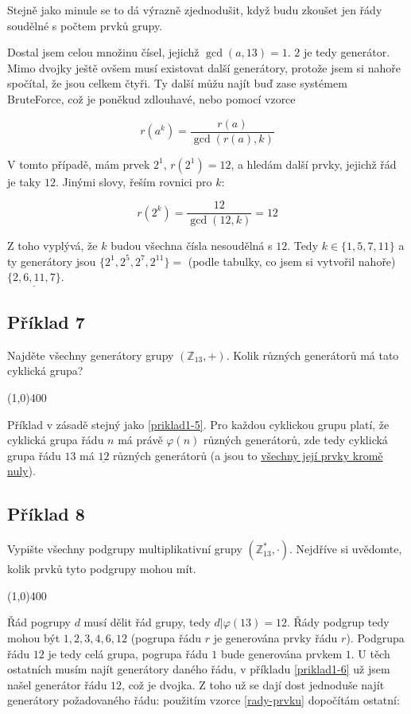 \documentclass{article}
\begin{document}
Stejně jako minule se to dá výrazně zjednodušit, když budu zkoušet jen řády soudělné s počtem prvků grupy.

Dostal jsem celou množinu čísel, jejichž $\gcd(a,13) = 1$. $2$ je tedy generátor. Mimo dvojky ještě ovšem musí existovat další generátory, protože jsem si nahoře spočítal, že jsou celkem čtyři. Ty další můžu najít buď zase systémem BruteForce\texttrademark, což je poněkud zdlouhavé, nebo pomocí vzorce

\begin{equation}
	r(a^k) = \frac{r(a)}{\gcd(r(a), k)}
	\label{rady-prvku}
\end{equation}

V tomto případě, mám prvek $2^1$, $r(2^1) = 12$, a hledám další prvky, jejichž řád je taky $12$. Jinými slovy, řeším rovnici pro $k$:

$$r(2^k) = \frac{12}{\gcd(12, k)} = 12$$

Z toho vyplývá, že $k$ budou všechna čísla nesoudělná s $12$. Tedy $k \in \{1, 5, 7, 11\}$ a ty generátory jsou $\{2^1, 2^5, 2^7, 2^{11}\} = $ (podle tabulky, co jsem si vytvořil nahoře) $\underline{\{2, 6, 11, 7\}}$.  

\subsection{Příklad 7}
Najděte všechny generátory grupy $(\mathbb{Z}_{13},+)$. Kolik různých generátorů má tato cyklická grupa?

\line(1,0){400}

Příklad v zásadě stejný jako \ref{priklad1-5}. Pro každou cyklickou grupu platí, že cyklická grupa řádu $n$ má právě $\varphi(n)$ různých generátorů, zde tedy cyklická grupa řádu $13$ má $\underline{12}$ různých generátorů (a jsou to \underline{všechny její prvky kromě nuly}).

\subsection{\label{priklad1-8}Příklad 8}
Vypište všechny podgrupy multiplikativní grupy $(\mathbb{Z}_{13}^{*},\cdot)$. Nejdříve si uvědomte, kolik prvků tyto podgrupy mohou mít.

\line(1,0){400}

Řád pogrupy $d$ musí dělit řád grupy, tedy $d | \varphi(13) = 12$. Řády podgrup tedy mohou být ${1,2,3,4,6,12}$ (pogrupa řádu $r$ je generována prvky řádu $r$). Podgrupa řádu $12$ je tedy celá grupa, pogrupa řádu $1$ bude generována prvkem $1$. U těch ostatních musím najít generátory daného řádu, v příkladu \ref{priklad1-6} už jsem našel generátor řádu $12$, což je dvojka. Z toho už se dají dost jednoduše najít generátory požadovaného řádu: použitím vzorce \ref{rady-prvku} dopočítám ostatní:
\end{document}
